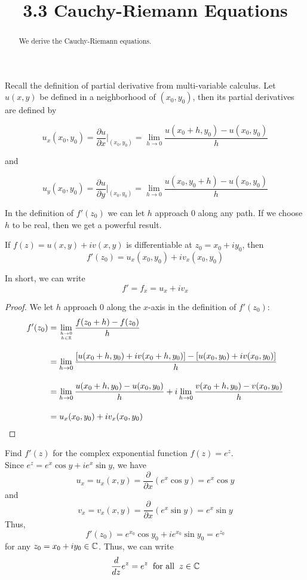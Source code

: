 \documentclass[handout]{ximera}
\title{3.3 Cauchy-Riemann Equations}
\begin{document}
\begin{abstract}
We derive the Cauchy-Riemann equations.
\end{abstract}

\maketitle

Recall the definition of partial derivative from multi-variable calculus.  
Let $u(x,y)$ be defined in a neighborhood of $(x_0,y_0)$, then its partial derivatives are defined by

\[
u_x(x_0, y_0) = \frac{\partial u}{\partial x}\Bigg|_{(x_0,y_0)} = \lim_{h \to 0} \frac{u(x_0 +h, y_0) - u(x_0,y_0)}{h}
\]

and

\[
u_y(x_0, y_0) = \frac{\partial u}{\partial y}\Bigg|_{(x_0,y_0)} = \lim_{h \to 0} \frac{u(x_0 , y_0+h) - u(x_0,y_0)}{h}
\]

In the definition of $f'(z_0)$ we can let $h$ approach $0$ along any path. If we choose $h$ to be real, then we get a powerful result.

\begin{theorem}
If $f(z) = u(x,y) + iv(x,y)$ is differentiable at $z_0 = x_0 + iy_0$, then
\[
f'(z_0) = u_x(x_0,y_0) + iv_x(x_0,y_0)
\]
\end{theorem}

\begin{remark}
In short, we can write
\[
f' = f_x = u_x + iv_x
\]
\end{remark}

\begin{proof}
We let $h$ approach $0$ along the $x$-axis in the definition of $f'(z_0)$:
\begin{align*}
f'(z_0) &= \lim_{h \to 0 \atop h \in \mathbb R} \frac{f(z_0 + h) -f(z_0)}{h} \\[10pt]
        &= \lim_{h \to 0} \frac{\left[u(x_0 +h, y_0) + iv(x_0 +h, y_0)\right] - \left[u(x_0,y_0)+iv(x_0, y_0)\right]}{h} \\[10pt]
        &=  \lim_{h \to 0} \frac{u(x_0 +h, y_0)- u(x_0,y_0)}{h} +i\lim_{h \to 0}\frac{v(x_0 +h, y_0)-v(x_0, y_0)}{h} \\[10pt]
        &= u_x(x_0,y_0) + iv_x(x_0,y_0)
\end{align*}
\end{proof}


\begin{example}
Find $f'(z)$ for the complex exponential function $f(z) = e^z$.\\
Since $e^z = e^x \cos y + i e^x \sin y$, we have
\[
u_x = u_x(x,y) = \frac{\partial}{\partial x} \left(e^x \cos y \right)= e^x \cos y 
\]
and
\[
 v_x = v_x(x,y) = \frac{\partial}{\partial x}\left(e^x \sin y\right) = e^x \sin y
\]
Thus, 
\[
f'(z_0) = e^{x_0} \cos y_0 + i e^{x_0} \sin y_0  = e^{z_0}
\]
for any $z_0 = x_0 + iy_0 \in \mathbb C$.
Thus, we can write
\[
\frac{d}{dz} e^z = e^z \;\; \mbox{for all} \;\; z \in \mathbb C
\]
\end{example}
\end{document}
